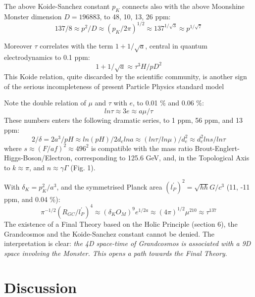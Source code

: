 \documentclass[twoside,draft]{article}
\begin{document}
\begin{sloppypar}
The above Koide-Sanchez constant $p_K$ connects also with the above Moonshine Monster dimension \cite{Conway} $D = 196883$, to 48, 10, 13, 26 ppm:
$$137/8 \approx p^2/D  \approx (p_K/2\pi)^{1/2} \approx 137^{1/\sqrt3} \approx p^{1/\sqrt7}$$

Moreover $\tau$ correlates with the
term $1+1/\sqrt{a}$, central in quantum electrodynamics to 0.1 ppm:
\begin{equation}
1+1/\sqrt{a} \approx \tau^{3} H/pD^{2}
\end{equation}
This Koide relation, quite discarded by the scientific community, is another sign of the serious incompleteness of present Particle Physics standard model

Note the double relation of $\mu$ and $\tau$ with $e$, to 0.01 \% and 0.06 \%:
\begin{equation}
ln\tau \approx 3e \approx a\mu/\tau 
\end{equation}
These numbers enters the following dramatic series, to 1 ppm, 56 ppm, and 13 ppm:
\begin{equation}
2/\delta = 2a^3/pH \approx ln(pH)/2d_e lna \approx (ln\tau/ln\mu)/d_e^2 \approx d_e^2 ln s/ln\tau
\end{equation}
where $s \approx (F/af)^2 \approx 496^2 $ is compatible with the mass ratio Brout-Englert-Higgs-Boson/Electron, corresponding to 125.6 GeV, and, in the Topological Axis to $k \approx \pi $, and $n \approx \gamma \Gamma$ (Fig. 1).

With $\delta_K = p_K^2/a^3 $, and the symmetrised Planck area $(l_P^{\prime})^2 = \sqrt{h \hbar} G/c^3$ (11, -11 ppm, and 0.04 \%):
\begin{equation}
\pi^{-1/2}(R_{GC}/l_P^{\prime})^4 \approx (\delta_K O_M )^9 e^{1/2a} \approx (4\pi)^{1/2}  \mu^{210} \approx \tau^{137}
\end{equation}
The existence of a Final Theory based on the Holic Principle (section 6), the Grandcosmos and the Koide-Sanchez constant cannot be denied. The interpretation is clear: \textit{the 4D space-time of Grandcosmos is associated with a 9D space involving the Monster. This opens a path towards the Final Theory}. 

\section {Discussion}


\end{sloppypar}
\end{document}
